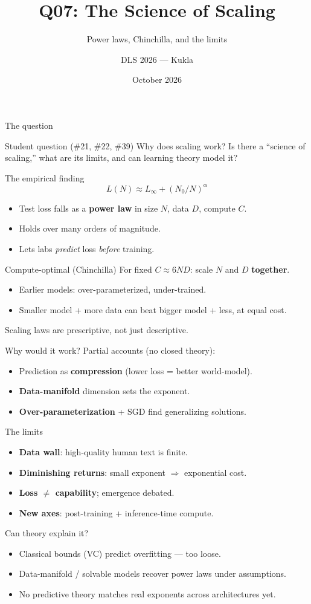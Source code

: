 \documentclass[aspectratio=169,10pt]{beamer}
\title{Q07: The Science of Scaling}
\subtitle{Power laws, Chinchilla, and the limits}
\author{DLS 2026 --- Kukla}
\date{October 2026}
\begin{document}
\maketitle

\begin{frame}{The question}
\begin{block}{Student question (\#21, \#22, \#39)}
Why does scaling work? Is there a ``science of scaling,'' what are its limits, and can learning theory
model it?
\end{block}
\end{frame}
\begin{frame}{The empirical finding}
\[ L(N) \approx L_\infty + (N_0/N)^{\alpha} \]
\begin{itemize}
\item Test loss falls as a \textbf{power law} in size $N$, data $D$, compute $C$.
\item Holds over many orders of magnitude.
\item Lets labs \emph{predict} loss \emph{before} training.
\end{itemize}
\end{frame}
\begin{frame}{Compute-optimal (Chinchilla)}
For fixed $C \approx 6ND$: scale $N$ and $D$ \textbf{together}.
\begin{itemize}
\item Earlier models: over-parameterized, under-trained.
\item Smaller model + more data can beat bigger model + less, at equal cost.
\end{itemize}
\alert{Scaling laws are prescriptive, not just descriptive.}
\end{frame}
\begin{frame}{Why would it work?}
Partial accounts (no closed theory):
\begin{itemize}
\item Prediction as \textbf{compression} (lower loss = better world-model).
\item \textbf{Data-manifold} dimension sets the exponent.
\item \textbf{Over-parameterization} + SGD find generalizing solutions.
\end{itemize}
\end{frame}
\begin{frame}{The limits}
\begin{itemize}
\item \textbf{Data wall}: high-quality human text is finite.
\item \textbf{Diminishing returns}: small exponent $\Rightarrow$ exponential cost.
\item \textbf{Loss $\ne$ capability}; emergence debated.
\item \textbf{New axes}: post-training + inference-time compute.
\end{itemize}
\end{frame}
\begin{frame}{Can theory explain it?}
\begin{itemize}
\item Classical bounds (VC) predict overfitting --- too loose.
\item Data-manifold / solvable models recover power laws under assumptions.
\item No predictive theory matches real exponents across architectures yet.
\end{itemize}
\end{frame}
\end{document}
